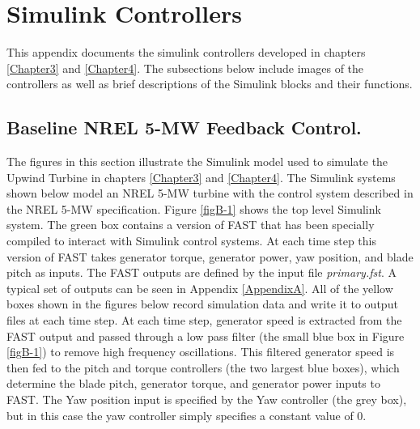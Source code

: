 
\chapter{Simulink Controllers} %

\label{AppendixB} %



This appendix documents the simulink controllers developed in chapters \ref{Chapter3} and \ref{Chapter4}. The subsections below include images of the controllers as well as brief descriptions of the Simulink blocks and their functions.


\section{Baseline NREL 5-MW Feedback Control.} \label{sectionB-1}

The figures in this section illustrate the Simulink model used to simulate the Upwind Turbine in chapters \ref{Chapter3} and \ref{Chapter4}. The Simulink systems shown below model an NREL 5-MW turbine with the control system described in the NREL 5-MW specification\cite{jonkman2009}. Figure \ref{figB-1} shows the top level Simulink system. The green box contains a version of FAST that has been specially compiled to interact with Simulink control systems. At each time step this version of FAST takes generator torque, generator power, yaw position, and blade pitch as inputs. The FAST outputs are defined by the input file \textit{primary.fst}. A typical set of outputs can be seen in Appendix \ref{AppendixA}. All of the yellow boxes shown in the figures below record simulation data and write it to output files at each time step. At each time step, generator speed is extracted from the FAST output and passed through a low pass filter (the small blue box in Figure \ref{figB-1}) to remove high frequency oscillations. This filtered generator speed is then fed to the pitch and torque controllers (the two largest blue boxes), which determine the blade pitch, generator torque, and generator power inputs to FAST. The Yaw position input is specified by the Yaw controller (the grey box), but in this case the yaw controller simply specifies a constant value of 0\degree.

